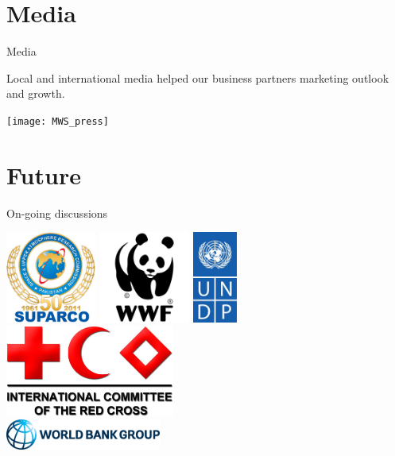 \documentclass[xcolor=dvipsnames,beamer,unknownkeysallowed]{beamer} %
\begin{document}
\section{Media}
\begin{frame}[fragile]{Media}

 Local and international media helped our business partners marketing outlook and growth. 

\begin{center}
  \texttt{[image: MWS\_press]}
\end{center}

\end{frame}

\section{Future}
\begin{frame}[fragile]{On-going discussions}

\begin{center}
  \includegraphics[height=3cm]{suparco_logo}
  \hspace{1mm}
  \includegraphics[height=3cm]{wwf_logo}
  \hspace{1mm}
  \includegraphics[height=3cm]{undp_logo}  \\
  \vspace{5mm}
  \includegraphics[height=3cm]{icrc_logo}  \\
  \vspace{3mm}
  \includegraphics[height=1cm]{wb_logo}
\end{center}

\end{frame}
\end{document}
